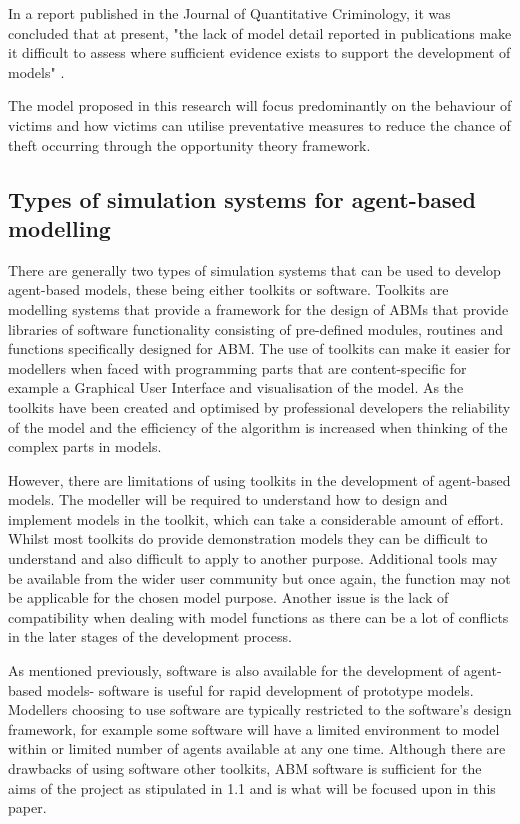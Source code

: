 \documentclass[11pt]{informatics-report}
\begin{document}
In a report published in the Journal of Quantitative Criminology, it was concluded that at present, "the lack of model detail reported in publications make it difficult to assess where sufficient evidence exists to support the development of models" \cite{groff}. \par

The model proposed in this research will focus predominantly on the behaviour of victims and how victims can utilise preventative measures to reduce the chance of theft occurring through the opportunity theory framework. 

\subsection{Types of simulation systems for agent-based modelling}

There are generally two types of simulation systems that can be used to develop agent-based models, these being either toolkits or software. Toolkits are modelling systems that provide a framework for the design of ABMs that provide libraries of software functionality consisting of pre-defined modules, routines and functions specifically designed for ABM. The use of toolkits can make it easier for modellers when faced with programming parts that are content-specific for example a Graphical User Interface and visualisation of the model. As the toolkits have been created and optimised by professional developers the reliability of the model and the efficiency of the algorithm is increased when thinking of the complex parts in models. \par 

However, there are limitations of using toolkits in the development of agent-based models. The modeller will be required to understand how to design and implement models in the toolkit, which can take a considerable amount of effort. Whilst most toolkits do provide demonstration models they can be difficult to understand and also difficult to apply to another purpose. Additional tools may be available from the wider user community but once again, the function may not be applicable for the chosen model purpose. Another issue is the lack of compatibility when dealing with model functions as there can be a lot of conflicts in the later stages of the development process. \par

As mentioned previously, software is also available for the development of agent-based models- software is useful for rapid development of prototype models. Modellers choosing to use software are typically restricted to the software's design framework, for example some software will have a limited environment to model within or limited number of agents available at any one time. Although there are drawbacks of using software other toolkits, ABM software is sufficient for the aims of the project as stipulated in 1.1 and is what will be focused upon in this paper. \par
\end{document}
